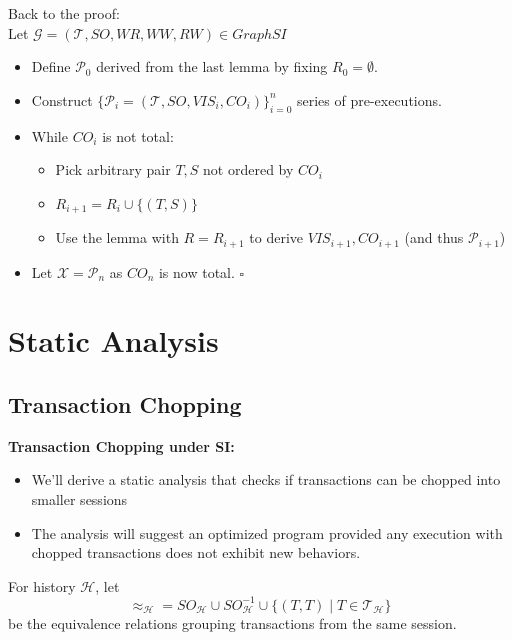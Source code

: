 \documentclass{beamer}
\begin{document}
\begin{frame}
	Back to the proof: \\
	Let $\mathcal{G} = (\mathcal{T}, SO, WR, WW, RW) \in GraphSI$
	\begin{itemize}
		\item Define $\mathcal{P}_0$ derived from the last lemma by fixing $R_0 = \emptyset$.
		\item Construct $\{\mathcal{P}_i = (\mathcal{T}, SO, VIS_i, CO_i)\}^n_{i=0}$ series of pre-executions.
		\item While $CO_i$ is not total:
		\begin{itemize}
			\item Pick arbitrary pair $T,S$ not ordered by $CO_i$
			\item $R_{i+1} = R_i \cup \{(T,S)\}$
			\item Use the lemma with $R = R_{i+1}$ to derive $VIS_{i+1}, CO_{i+1}$ (and thus $\mathcal{P}_{i+1}$)
		\end{itemize}
		\item Let $\mathcal{X} = \mathcal{P}_n$ as $CO_n$ is now total. $\square$
	\end{itemize}
\end{frame}

\section{Static Analysis}
\subsection{Transaction Chopping}

\begin{frame}
	\textbf{Transaction Chopping under SI:}
	\begin{itemize}
		\item We'll derive a static analysis that checks if transactions can be chopped into smaller sessions
		\item The analysis will suggest an optimized program provided any execution with chopped transactions does not exhibit new behaviors.
	\end{itemize}
\end{frame}


\begin{frame}
	For history $\mathcal{H}$, let
	$$ \approx_\mathcal{H} = SO_\mathcal{H} \cup SO^{-1}_\mathcal{H} \cup \{ (T,T) \mid T \in \mathcal{T}_\mathcal{H}\}$$
	be the equivalence relations grouping transactions from the same session.
\end{frame}
\end{document}
